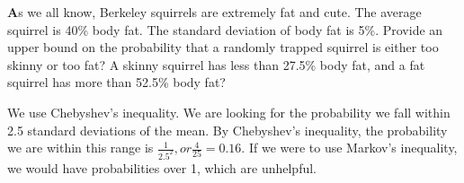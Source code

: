 \question \textbf As we all know, Berkeley squirrels are extremely fat and cute. 
The average squirrel is 40\% body fat. The standard deviation of body 
fat is 5\%. Provide an upper bound on the probability that a randomly 
trapped squirrel is either too skinny or too fat? A skinny squirrel 
has less than 27.5\% body fat, and a fat squirrel has more than 52.5\% 
body fat?
\begin{solution}[3cm]
We use Chebyshev's inequality. We are looking for the probability we 
fall within 2.5 standard deviations of the mean. By Chebyshev's 
inequality, the probability we are within this range is $\frac{1}{2.5^2}, or \frac{4}{25} = 0.16$.
If we were to use Markov's inequality, we would have probabilities over 1, which are unhelpful.
\end{solution}   